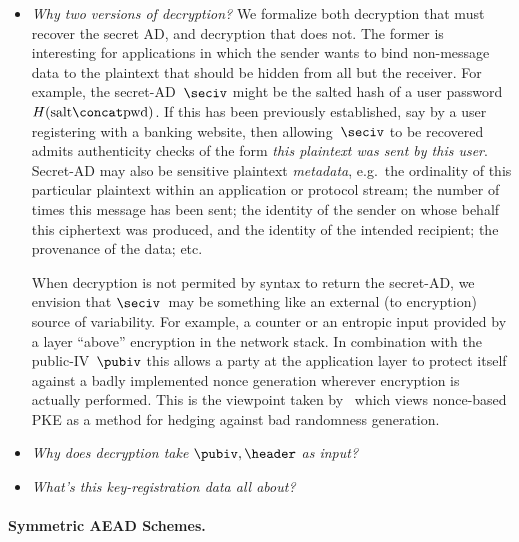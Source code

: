 \begin{itemize}
\item\emph{Why two versions of decryption?}  We formalize both decryption that must recover the secret AD, and decryption that does not.  The former is interesting for applications in which the sender wants to bind non-message data to the plaintext that should be hidden from all but the receiver.  For example, the secret-AD~$\seciv$ might be the salted hash of a user password $H(\mathrm{salt} \concat \mathrm{pwd})$.  If this has been previously established, say by a user registering with a banking website, then allowing~$\seciv$ to be recovered admits authenticity checks of the form \emph{this plaintext was sent by this user}.  Secret-AD may also be sensitive plaintext \emph{metadata}, e.g.\ the ordinality of this particular plaintext within an application or protocol stream; the number of times this message has been sent; the identity of the sender on whose behalf this ciphertext was produced, and the identity of the intended recipient; the provenance of the data; etc. 

When decryption is not permited by syntax to return the secret-AD, we envision that $\seciv$~may be something like an external (to encryption) source of variability.  For example, a counter or an entropic input provided by a layer ``above'' encryption in the network stack.  In combination with the public-IV~$\pubiv$ this allows a party at the application layer to protect itself against a badly implemented nonce generation wherever encryption is actually performed.  
This is the viewpoint taken by~\cite{mihir} which views nonce-based PKE as a method for hedging against bad randomness generation.

\item\emph{Why does decryption take $\pubiv,\header$ as input?} 

\item\emph{What's this key-registration data all about?} 
\end{itemize}
 
\paragraph{Symmetric AEAD Schemes. } 


